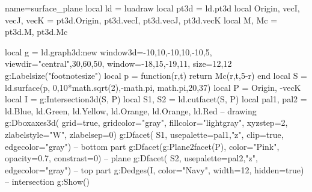 \documentclass[border=5pt]{standalone}%
\begin{document}
\begin{luadraw}{name=surface_plane}
local ld = luadraw
local pt3d = ld.pt3d
local Origin, vecI, vecJ, vecK = pt3d.Origin, pt3d.vecI, pt3d.vecJ, pt3d.vecK
local M, Mc = pt3d.M, pt3d.Mc

local g = ld.graph3d:new{ window3d={-10,10,-10,10,-10,5}, 
    viewdir={"central",30,60,50}, window={-18,15,-19,11}, size={12,12} }
g:Labelsize("footnotesize")
local p = function(r,t) return Mc(r,t,5-r) end
local S = ld.surface(p, 0,10*math.sqrt(2),-math.pi, math.pi,{20,37})
local P = {Origin, -vecK}
local I = g:Intersection3d(S, P)
local S1, S2 = ld.cutfacet(S, P)
local pal1, pal2 = {ld.Blue, ld.Green, ld.Yellow, ld.Orange}, {ld.Orange, ld.Red}
-- drawing
g:Dboxaxes3d({ grid=true, gridcolor="gray", fillcolor="lightgray", xyzstep=2,
    zlabelstyle="W", zlabelsep=0})
g:Dfacet( S1, {usepalette={pal1,"z"}, clip=true, edgecolor="gray"}) -- bottom part
g:Dfacet(g:Plane2facet(P), {color="Pink", opacity=0.7, constrast=0}) -- plane
g:Dfacet( S2, {usepalette={pal2,"z"}, edgecolor="gray"})    -- top part
g:Dedges(I, {color="Navy", width=12, hidden=true}) -- intersection
g:Show()
\end{luadraw}
\end{document}

